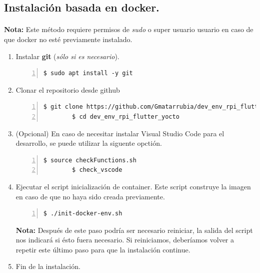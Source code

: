 \subsection{Instalación basada en docker.}

\paragraph{}\textbf{Nota:} Este método requiere permisos de \emph{sudo} o super usuario
usuario en caso de que docker no esté previamente instalado.

\begin{enumerate}
    \item Instalar \textbf{\gls{git}} (\emph{sólo si es necesario}).
    \begin{lstlisting}[style=consola, numbers=left]
        $ sudo apt install -y git
    \end{lstlisting}

    \item Clonar el repositorio desde github
    \begin{lstlisting}[style=consola, numbers=left]
        $ git clone https://github.com/Gmatarrubia/dev_env_rpi_flutter_yocto.git
        $ cd dev_env_rpi_flutter_yocto
    \end{lstlisting}

    \item (Opcional) En caso de necesitar instalar Visual Studio Code para el desarrollo,
    se puede utilizar la siguente opctión.
    \begin{lstlisting}[style=consola, numbers=left]
        $ source checkFunctions.sh
        $ check_vscode
    \end{lstlisting}

    \item Ejecutar el script inicialización de container. Este script construye la
    imagen en caso de que no haya sido creada previamente.
    \begin{lstlisting}[style=consola, numbers=left]
        $ ./init-docker-env.sh
    \end{lstlisting}
    \textbf{Nota:} Después de este paso podría ser necesario reiniciar, la salida del
    script nos indicará si ésto fuera necesario. Si reiniciamos, deberíamos volver
    a repetir este último paso para que la instalación continue.

    \item Fin de la instalación.
\end{enumerate}

